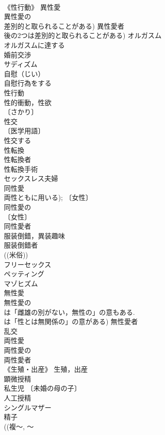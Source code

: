 \documentclass[8pt]{extreport}
\begin{document}
\begin{CJK}{UTF8}{min}
\\	《性行動》 異性愛 
\\	異性愛の 
\\	差別的と取られることがある) 異性愛者 
\\	後の2つは差別的と取られることがある) オルガスム 
\\	オルガスムに達する 
\\	婚前交渉 
\\	サディズム 
\\	自慰（じい） 
\\	自慰行為をする 
\\	性行動 
\\	性的衝動，性欲 
\\	〔さかり〕
\\	性交 
\\	〔医学用語〕
\\	性交する 
\\	性転換 
\\	性転換者 
\\	性転換手術 
\\	セックスレス夫婦 
\\	同性愛 
\\	両性ともに用いる); 〔女性〕
\\	同性愛の 
\\	〔女性〕
\\	同性愛者 
\\	服装倒錯，異装趣味 
\\	服装倒錯者 
\\	((米俗))
\\	フリーセックス 
\\	ペッティング 
\\	マゾヒズム 
\\	無性愛 
\\	無性愛の 
\\	は「雌雄の別がない，無性の」の意もある. 
\\	は「性とは無関係の」の意がある) 無性愛者 
\\	乱交 
\\	両性愛 
\\	両性愛の 
\\	両性愛者 
\\	《生殖・出産》 生殖，出産 
\\	顕微授精 
\\	私生児 〔未婚の母の子〕
\\	人工授精 
\\	シングルマザー 
\\	精子 
\\	((複〜, 〜

\end{CJK}
\end{document}
